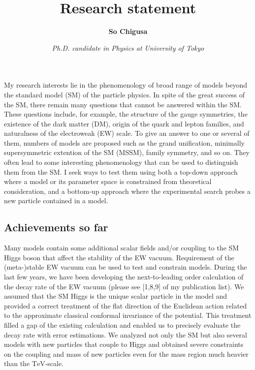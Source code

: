 \documentclass[12pt,notitlepage]{book}
\title{\vspace*{-3cm}Research statement}
\author{\textbf{So Chigusa}}
\date{\vspace*{-4mm}\textit{Ph.D. candidate in Physics at University of Tokyo}}
\begin{document}
\maketitle

My research interests lie in the phenomenology of broad range of models beyond the standard model (SM) of the particle physics.
In spite of the great success of the SM, there remain many questions that cannot be answered within the SM.
These questions include, for example, the structure of the gauge symmetries, the existence of the dark matter (DM), origin of the quark and lepton families, and naturalness of the electroweak (EW) scale.
To give an answer to one or several of them, numbers of models are proposed such as the grand unification, minimally supersymmetric extention of the SM (MSSM), family symmetry, and so on.
They often lead to some interesting phenomenology that can be used to distinguish them from the SM.
I seek ways to test them using both a top-down approach where a model or its parameter space is constrained from theoretical consideration, and a bottom-up approach where the experimental search probes a new particle contained in a model.

\vspace*{-2mm}
\subsection*{Achievements so far}


Many models contain some additional scalar fields and/or coupling to the SM Higgs boson that affect the stability of the EW vacuum.
Requirement of the (meta-)stable EW vacuum can be used to test and constrain models.
During the last few years, we have been developing the next-to-leading order calculation of the decay rate of the EW vacuum (please see [1,8,9] of my publication list).
We assumed that the SM Higgs is the unique scalar particle in the model and provided a correct treatment of the flat direction of the Euclidean action related to the approximate classical conformal invariance of the potential.
This treatment filled a gap of the existing calculation and enabled us to precisely evaluate the decay rate with error estimations.
We analyzed not only the SM but also several models with new particles that couple to Higgs and obtained severe constraints on the coupling and mass of new particles even for the mass
region much heavier than the $\mathrm{TeV}$-scale.
\end{document}
